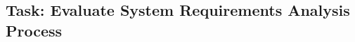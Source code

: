 \documentclass{article}
\begin{document}
	\subsection{Task: Evaluate System Requirements Analysis Process}
	\begin{comment}
		
	
	a.	Verify that the correct participants are involved in the system requirements analysis process to identify all user needs.
	b.	Verify that requirements are reviewed to determine if they are feasible to implement, clearly stated, and consistent.
	c.	Verify that changes to allocated requirements, work products and activities are identified, reviewed, and tracked to closure.
	d.	Verify that project personnel involved in the system requirements analysis process are trained in the necessary procedures and standards applicable to their area of responsibility to do the job correctly.
	e.	Verify that the commitments resulting from allocated requirements are negotiated and agreed upon by the affected groups.
	f.	Verify that commitments are documented, communicated, reviewed, and accepted.
	g.	Verify that allocated requirements identified as having potential problems are reviewed with the group responsible for analyzing system requirements and documents, and that necessary changes are made.
	h.	Verify that the prescribed processes for defining, documenting, and allocating requirements are followed and documented.
	i.	Confirm that a configuration management process is in place to control and manage the baseline.
	j.	Verify that requirements are documented, managed, controlled, and traced (preferably via a matrix).
	k.	Verify that the agreed upon requirements are addressed in the SDP.
	SQA may use the audit checklist in Figure B-3 as a guide for conducting the evaluation.
	The results of this task shall be documented using the Process Audit Form described in Section 7 and provided to project management.  SQA recommendation for corrective action requires project management’s disposition and will be processed in accordance with the guidance in Section 7
	\end{comment}
	
\end{document}
